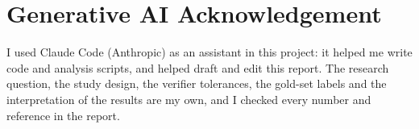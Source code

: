 \section*{Generative AI Acknowledgement}
\label{sec:genai}

I used Claude Code (Anthropic) as an assistant in this project: it helped me write code and analysis scripts, and helped draft and edit this report. The research question, the study design, the verifier tolerances, the gold-set labels and the interpretation of the results are my own, and I checked every number and reference in the report.
